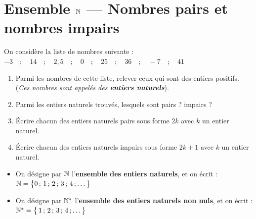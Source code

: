 \documentclass[10pt, a4paper]{article}
\begin{document}


\newpage

\pagestyle{cours}

\pagestyle{cours}

\section{Ensemble $\mathbb{N}$ --- Nombres pairs et nombres impairs }

\begin{Activite}[][10 min]
On considère la liste de nombres suivante :
$-3 \quad ; \quad 14 \quad ; \quad 2,5 \quad ; \quad 0 \quad ; \quad 25 \quad ; \quad 36 \quad ; \quad -7 \quad ; \quad 41$
\begin{enumerate}[leftmargin=*,itemsep=0.5pt]
    \item Parmi les nombres de cette liste, relever ceux qui sont des entiers positifs. \\
    (\textit{Ces nombres sont appelés des \textbf{entiers naturels}}).

    \item Parmi les entiers naturels trouvés, lesquels sont pairs ? impairs ?

    \item Écrire chacun des entiers naturels pairs sous forme $2k$ avec $k$ un entier naturel.
    \item Écrire chacun des entiers naturels impairs sous forme $2k+1$ avec $k$ un entier naturel.
\end{enumerate}
\end{Activite}

\begin{Definition}[]
\begin{itemize}[leftmargin=*,itemsep=0.5pt]
    \item On désigne par $\mathbb{N}$ l'\textbf{ensemble des entiers naturels}, et on écrit :
$\mathbb{N} = \big\{0\,;\,1\,;\,2\,;\,3\,;\,4\,;\ldots\big\}$

    \item On désigne par $\mathbb{N}^*$ l'\textbf{ensemble des entiers naturels non nuls}, et on écrit :
$\mathbb{N}^* = \big\{\,1\,;\,2\,;\,3\,;\,4\,;\ldots\big\}$
\end{itemize}
\end{Definition}
\end{document}

